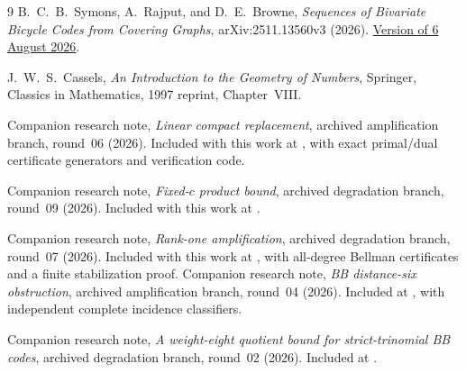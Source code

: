 \begin{thebibliography}{9}
B.~C.~B.~Symons, A.~Rajput, and D.~E.~Browne,
\emph{Sequences of Bivariate Bicycle Codes from Covering Graphs},
arXiv:2511.13560v3 (2026).
\href{https://arxiv.org/abs/2511.13560v3}{Version of 6 August 2026}.

J.~W.~S.~Cassels,
\emph{An Introduction to the Geometry of Numbers},
Springer, Classics in Mathematics, 1997 reprint, Chapter~VIII.

Companion research note, \emph{Linear compact replacement},
archived amplification branch, round~06 (2026).
Included with this work at
,
with exact primal/dual certificate generators and verification code.

Companion research note, \emph{Fixed-$c$ product bound},
archived degradation branch, round~09 (2026).
Included with this work at
.

Companion research note, \emph{Rank-one amplification},
archived degradation branch, round~07 (2026).
Included with this work at
,
with all-degree Bellman certificates and a finite stabilization proof.
Companion research note, \emph{BB distance-six obstruction},
archived amplification branch, round~04 (2026).
Included at
,
with independent complete incidence classifiers.

Companion research note, \emph{A weight-eight quotient bound for strict-trinomial BB codes},
archived degradation branch, round~02 (2026).
Included at
.
\end{thebibliography}
